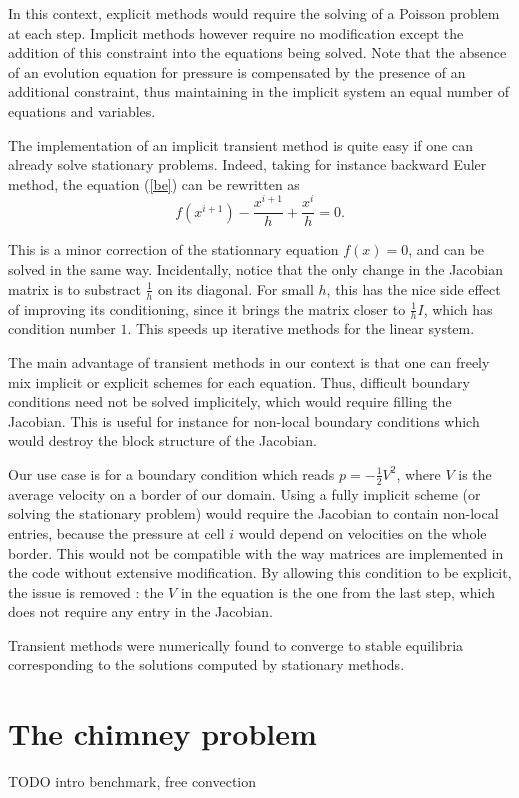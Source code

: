 \documentclass[12pt]{article}
\begin{document}
In this context, explicit methods would require the solving of a
Poisson problem at each step. Implicit methods however require no
modification except the addition of this constraint into the equations
being solved. Note that the absence of an evolution equation for
pressure is compensated by the presence of an additional constraint,
thus maintaining in the implicit system an equal number of equations
and variables.

The implementation of an implicit transient method is quite easy if
one can already solve stationary problems. Indeed, taking for instance
backward Euler method, the equation (\ref{be}) can be rewritten
as
$$f(x^{i+1}) - \frac{x^{i+1}}{h} + \frac{x^i}{h} = 0.$$

This is a minor correction of the stationnary equation $f(x) = 0$, and
can be solved in the same way. Incidentally, notice that the only
change in the Jacobian matrix is to substract $\frac{1}{h}$ on its
diagonal. For small $h$, this has the nice side effect of improving
its conditioning, since it brings the matrix closer to $\frac{1}{h}
I$, which has condition number $1$. This speeds up iterative methods
for the linear system.

The main advantage of transient methods in our context is that one
can freely mix implicit or explicit schemes for each equation. Thus,
difficult boundary conditions need not be solved implicitely, which
would require filling the Jacobian. This is useful for instance for
non-local boundary conditions which would destroy the block structure
of the Jacobian.

Our use case is for a boundary condition which reads $p = -
\frac{1}{2} V^2$, where $V$ is the average velocity on a border of our
domain. Using a fully implicit scheme (or solving the stationary
problem) would require the Jacobian to contain non-local entries,
because the pressure at cell $i$ would depend on velocities on the
whole border. This would not be compatible with the way matrices are
implemented in the code without extensive modification. By allowing
this condition to be explicit, the issue is removed : the $V$ in the
equation is the one from the last step, which does not require any
entry in the Jacobian.

Transient methods were numerically found to converge to stable
equilibria corresponding to the solutions computed by stationary
methods.
\section{The chimney problem}
TODO intro benchmark, free convection
\end{document}
